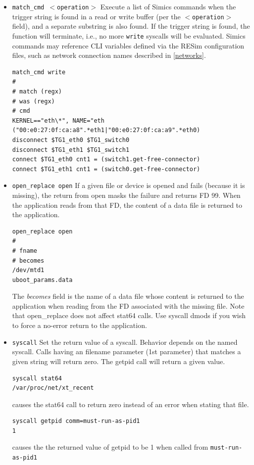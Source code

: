 \documentclass[titlepage]{article}
\begin{document}
\begin{itemize}
\item {\tt match\_cmd $<$operation$>$} Execute a list of Simics commands when the trigger string is found
in a read or write buffer (per the {\tt $<$operation$>$} field), and a separate substring is also found.  If the trigger string is
found, the function will terminate, i.e., no more {\tt write} syscalls will be evaluated.  Simics commands may reference
CLI variables defined via the RESim configuration files, such as network connection names described in \ref{networks}.
\begin{verbatim}
match_cmd write
#
# match (regx)
# was (regx)
# cmd
KERNEL=="eth\*", NAME="eth
("00:e0:27:0f:ca:a8".*eth1|"00:e0:27:0f:ca:a9".*eth0)
disconnect $TG1_eth0 $TG1_switch0
disconnect $TG1_eth1 $TG1_switch1
connect $TG1_eth0 cnt1 = (switch1.get-free-connector)
connect $TG1_eth1 cnt1 = (switch0.get-free-connector)
\end{verbatim}

\item {\tt open\_replace open} If a given file or device is opened and fails (because it is missing), the return from open
masks the failure and returns FD 99.  When the application reads from that FD, the content of a data file is returned to the application.
\begin{verbatim}
open_replace open
#
# fname
# becomes
/dev/mtd1
uboot_params.data
\end{verbatim}
\noindent The \textit{becomes} field is the name of a data file whose content is returned to the application when reading from the FD associated with
the missing file.  
Note that open\_replace does not affect stat64 calls.  Use syscall dmods if you wish to force a no-error return to the application.

\item {\tt syscall} Set the return value of a syscall.  Behavior depends on the named syscall.   Calls having an filename parameter (1st parameter) 
that matches a given string will return zero.  The getpid call will return a given value.
\begin{verbatim}
syscall stat64
/var/proc/net/xt_recent
\end{verbatim}
\noindent causes the stat64 call to return zero instead of an error when stating that file.
\begin{verbatim}
syscall getpid comm=must-run-as-pid1
1
\end{verbatim}
\noindent causes the the returned value of getpid to be 1 when called from {\tt must-run-as-pid1}
\end{itemize}
\end{document}
